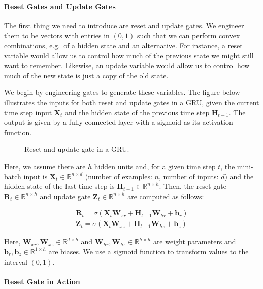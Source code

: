 \paragraph{Reset Gates and Update Gates}

The first thing we need to introduce are reset and update gates. We engineer them to be vectors with entries in $(0,1)$ such that we can perform convex combinations, e.g.\ of a hidden state and an alternative. For instance, a reset variable would allow us to control how much of the previous state we might still want to remember. Likewise, an update variable would allow us to control how much of the new state is just a copy of the old state.

We begin by engineering gates to generate these variables. The figure below illustrates the inputs for both reset and update gates in a GRU, given the current time step input $\mathbf{X}_t$ and the hidden state of the previous time step $\mathbf{H}_{t-1}$. The output is given by a fully connected layer with a sigmoid as its activation function.

\begin{figure}[hpt]
	\centering
	
	\caption{Reset and update gate in a GRU.}
	\label{fig:gru_1}
\end{figure}

Here, we assume there are $h$ hidden units and, for a given time step $t$, the
mini-batch input is $\mathbf{X}_t \in \mathbb{R}^{n \times d}$ (number of examples: $n$, number of inputs: $d$) and the hidden state of the last time step is $\mathbf{H}_{t-1} \in \mathbb{R}^{n \times h}$. Then, the reset gate $\mathbf{R}_t \in \mathbb{R}^{n \times h}$ and update gate $\mathbf{Z}_t \in \mathbb{R}^{n \times h}$ are computed as follows:

$$
\begin{aligned}
\mathbf{R}_t = \sigma(\mathbf{X}_t \mathbf{W}_{xr} + \mathbf{H}_{t-1} \mathbf{W}_{hr} + \mathbf{b}_r)\\
\mathbf{Z}_t = \sigma(\mathbf{X}_t \mathbf{W}_{xz} + \mathbf{H}_{t-1} \mathbf{W}_{hz} + \mathbf{b}_z)
\end{aligned}
$$

Here, $\mathbf{W}_{xr}, \mathbf{W}_{xz} \in \mathbb{R}^{d \times h}$ and $\mathbf{W}_{hr}, \mathbf{W}_{hz} \in \mathbb{R}^{h \times h}$ are weight parameters and $\mathbf{b}_r, \mathbf{b}_z \in \mathbb{R}^{1 \times h}$ are biases. We use a sigmoid function to transform values to the interval $(0,1)$.

\paragraph{Reset Gate in Action}

